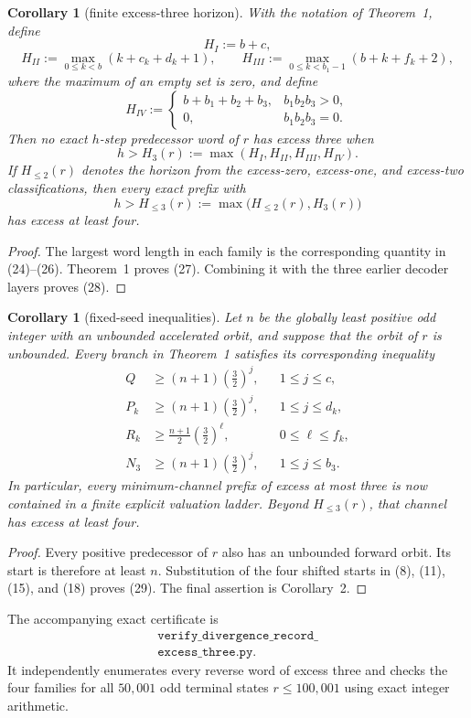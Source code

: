 \documentclass[11pt]{article}
\newtheorem{corollary}[theorem]{Corollary}
\begin{document}
\begin{corollary}[finite excess-three horizon]
With the notation of Theorem~1, define
\[
 H_I:=b+c,
 \tag{24}
\]
\[
 H_{II}:=\max_{0\leq k<b}(k+c_k+d_k+1),
 \qquad
 H_{III}:=\max_{0\leq k<b_1-1}(b+k+f_k+2),
 \tag{25}
\]
where the maximum of an empty set is zero, and define
\[
 H_{IV}:=
 \begin{cases}
 b+b_1+b_2+b_3,&b_1b_2b_3>0,\\
 0,&b_1b_2b_3=0.
 \end{cases}
 \tag{26}
\]
Then no exact $h$-step predecessor word of $r$ has excess three when
\[
 \boxed{h>H_3(r):=\max(H_I,H_{II},H_{III},H_{IV}).}
 \tag{27}
\]
If $H_{\leq2}(r)$ denotes the horizon from the excess-zero, excess-one,
and excess-two classifications, then every exact prefix with
\[
 h>H_{\leq3}(r):=\max\bigl(H_{\leq2}(r),H_3(r)\bigr)
 \tag{28}
\]
has excess at least four.
\end{corollary}

\begin{proof}
The largest word length in each family is the corresponding quantity in
(24)--(26).  Theorem~1 proves (27).  Combining it with the three earlier
decoder layers proves (28).
\end{proof}

\begin{corollary}[fixed-seed inequalities]
Let $n$ be the globally least positive odd integer with an unbounded
accelerated orbit, and suppose that the orbit of $r$ is unbounded.  Every
branch in Theorem~1 satisfies its corresponding inequality
\[
 \boxed{
 \begin{aligned}
 Q&\geq(n+1)\left(\frac32\right)^j,
 &&1\leq j\leq c,\\
 P_k&\geq(n+1)\left(\frac32\right)^j,
 &&1\leq j\leq d_k,\\
 R_k&\geq\frac{n+1}{2}\left(\frac32\right)^\ell,
 &&0\leq\ell\leq f_k,\\
 N_3&\geq(n+1)\left(\frac32\right)^j,
 &&1\leq j\leq b_3.
 \end{aligned}}
 \tag{29}
\]
In particular, every minimum-channel prefix of excess at most three is
now contained in a finite explicit valuation ladder.  Beyond
$H_{\leq3}(r)$, that channel has excess at least four.
\end{corollary}

\begin{proof}
Every positive predecessor of $r$ also has an unbounded forward orbit.
Its start is therefore at least $n$.  Substitution of the four shifted
starts in (8), (11), (15), and (18) proves (29).  The final assertion is
Corollary~2.
\end{proof}

The accompanying exact certificate is
\[
 \begin{gathered}
 \texttt{verify\_divergence\_record\_}\\
 \texttt{excess\_three.py}.
 \end{gathered}
\]
It independently enumerates every reverse word of excess three and checks the four
families for all $50{,}001$ odd terminal states $r\leq100{,}001$ using
exact integer arithmetic.
\end{document}
